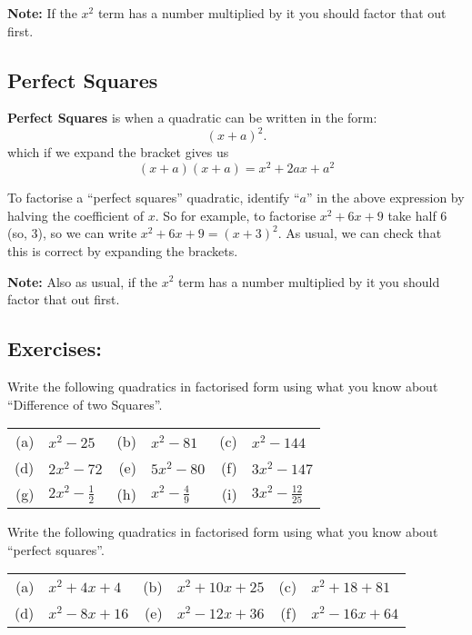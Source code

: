 \documentclass[12pt]{article}
\begin{document}
\textbf{Note:} If the $x^2$ term has a number multiplied by it you should factor that out first.



\subsection*{Perfect Squares}

\textbf{Perfect Squares} is when a quadratic can be written in the form: 
\begin{equation*}
(x + a)^2.
\end{equation*}
which if we expand the bracket gives us
\begin{equation*}
(x + a)(x + a) = x^2 + 2ax + a^2
\end{equation*}

To factorise a ``perfect squares'' quadratic, identify ``$a$'' in the above expression by halving the coefficient of $x$. So for example, to factorise $x^2 + 6x + 9$ take half $6$ (so, $3$), so we can write $x^2 + 6x + 9 = (x+3)^2$. As usual, we can check that this is correct by expanding the brackets.

\textbf{Note:} Also as usual, if the $x^2$ term has a number multiplied by it you should factor that out first.

\pagebreak
\subsection*{Exercises:}

Write the following quadratics in factorised form using what you know about ``Difference of two Squares''. \\
\begin{center}
\begin{tabular}{rlrlrl}
(a) & $x^2 - 25$ & (b) & $x^2 -81$ & (c) & $x^2 -144$ \\
(d) & $2x^2 - 72$ & (e) & $5x^2 - 80$ & (f) & $3x^2 -147$ \\
(g) & $2x^2 - \frac{1}{2}$ & (h) & $x^2 - \frac{4}{9}$ & (i) & $3x^2 - \frac{12}{25}$ \\
\end{tabular}
\end{center}

Write the following quadratics in factorised form using what you know about ``perfect squares''. \\
\begin{center}
\begin{tabular}{rlrlrl}
(a) & $x^2 + 4x + 4$ & (b) & $x^2 + 10x + 25 $ & (c) & $x^2 + 18 + 81$ \\
(d) & $x^2 -8x + 16$ & (e) & $x^2 - 12x + 36$ & (f) & $x^2 - 16x + 64$ \\
\end{tabular}
\end{center}
\end{document}

